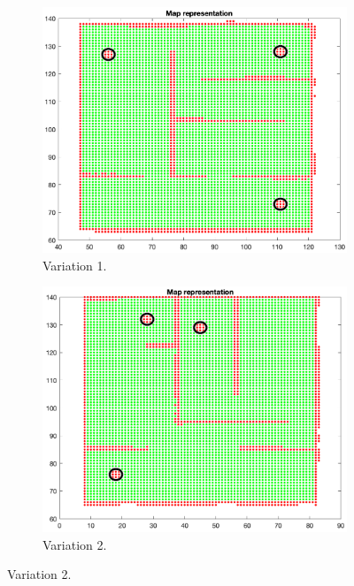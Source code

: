 \documentclass[a4paper, 10pt, conference]{ieeeconf}
\begin{document}
    \begin{figure}[!h]
        \centering
        \begin{subfigure}[b]{0.23\textwidth}
            \centering
            \includegraphics[width=\textwidth]{resources/png/house-var-1.png}
            \caption{Variation 1.}
        \end{subfigure}
        \hfill
        \begin{subfigure}[b]{0.23\textwidth}
            \centering
            \includegraphics[width=\textwidth]{resources/png/house-var-2.png}
            \caption{Variation 2.}
        \end{subfigure}

\end{figure}
\end{document}
